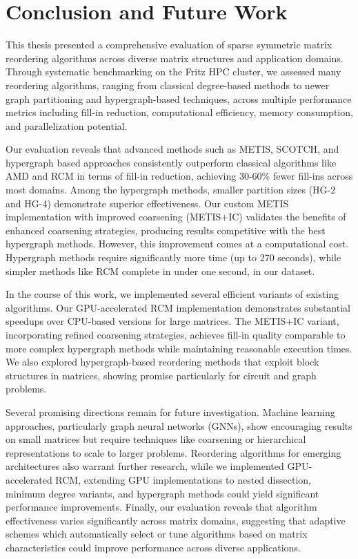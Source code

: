 \chapter{Conclusion and Future Work}
\label{ch:conclusion}

This thesis presented a comprehensive evaluation of sparse symmetric matrix reordering algorithms across diverse matrix structures and application domains. Through systematic benchmarking on the Fritz HPC cluster, we assessed many reordering algorithms, ranging from classical degree-based methods to newer graph partitioning and hypergraph-based techniques, across multiple performance metrics including fill-in reduction, computational efficiency, memory consumption, and parallelization potential.

Our evaluation reveals that advanced methods such as METIS, SCOTCH, and hypergraph based approaches consistently outperform classical algorithms like AMD and RCM in terms of fill-in reduction, achieving 30-60\% fewer fill-ins across most domains. Among the hypergraph methods, smaller partition sizes (HG-2 and HG-4) demonstrate superior effectiveness. Our custom METIS implementation with improved coarsening (METIS+IC) validates the benefits of enhanced coarsening strategies, producing results competitive with the best hypergraph methods. However, this improvement comes at a computational cost. Hypergraph methods require significantly more time (up to 270 seconds), while simpler methods like RCM complete in under one second, in our dataset.

In the course of this work, we implemented several efficient variants of existing algorithms. Our GPU-accelerated RCM implementation demonstrates substantial speedups over CPU-based versions for large matrices. The METIS+IC variant, incorporating refined coarsening strategies, achieves fill-in quality comparable to more complex hypergraph methods while maintaining reasonable execution times. We also explored hypergraph-based reordering methods that exploit block structures in matrices, showing promise particularly for circuit and graph problems.


Several promising directions remain for future investigation. Machine learning approaches, particularly graph neural networks (GNNs), show encouraging results on small matrices but require techniques like coarsening or hierarchical representations to scale to larger problems. Reordering algorithms for emerging architectures also warrant further research, while we implemented GPU-accelerated RCM, extending GPU implementations to nested dissection, minimum degree variants, and hypergraph methods could yield significant performance improvements. Finally, our evaluation reveals that algorithm effectiveness varies significantly across matrix domains, suggesting that adaptive schemes which automatically select or tune algorithms based on matrix characteristics could improve performance across diverse applications.
